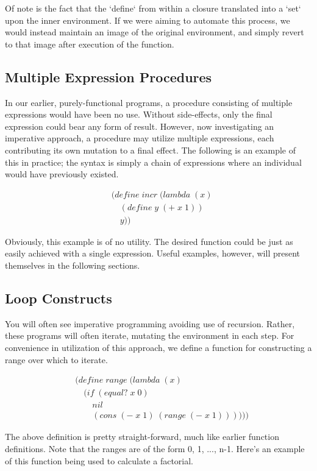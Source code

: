 Of note is the fact that the `define` from within a closure translated into a `set`
upon the inner environment. If we were aiming to automate this process, we would
instead maintain an image of the original environment, and simply revert to that 
image after execution of the function.

\subsection{Multiple Expression Procedures}
In our earlier, purely-functional programs, a procedure consisting of multiple 
expressions would have been no use. Without side-effects, only the final expression 
could bear any form of result. However, now investigating an imperative approach, 
a procedure may utilize multiple expressions, each contributing its own mutation to 
a final effect. The following is an example of this in practice; the syntax is 
simply a chain of expressions where an individual would have previously existed.

\begin{align*}
& (define \; incr \; (lambda \; (x)
\\& \quad (define \; y \; (+ \; x \; 1))
\\& \quad y))
\end{align*}

Obviously, this example is of no utility. The desired function could be just as 
easily achieved with a single expression. Useful examples, however, will present 
themselves in the following sections.

\subsection{Loop Constructs}
You will often see imperative programming avoiding use of recursion. Rather, these 
programs will often iterate, mutating the environment in each step. For convenience 
in utilization of this approach, we define a function for constructing a range over 
which to iterate.

\begin{align*}
& (define \; range \; (lambda \; (x)
\\& \quad (if \; (equal? \; x \; 0)
\\& \qquad nil
\\& \qquad (cons \; (- \; x \; 1) \; (range \; (- \; x \; 1))))))
\end{align*}

The above definition is pretty straight-forward, much like earlier function 
definitions. Note that the ranges are of the form 0, 1, ..., n-1. Here's an example 
of this function being used to calculate a factorial.

